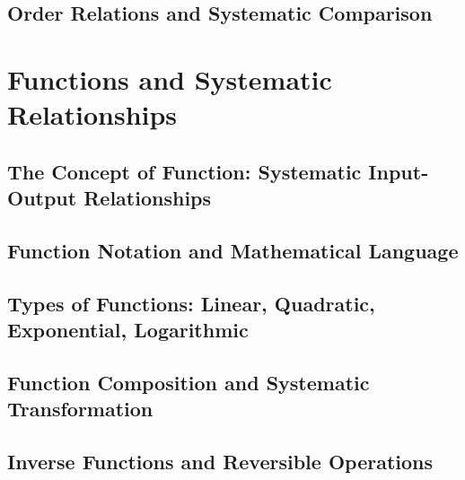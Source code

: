 \documentclass[12pt, oneside, openany]{book}
\begin{document}
\section{Order Relations and Systematic Comparison}


\chapter{Functions and Systematic Relationships}

\section{The Concept of Function: Systematic Input-Output Relationships}

\section{Function Notation and Mathematical Language}

\section{Types of Functions: Linear, Quadratic, Exponential, Logarithmic}

\section{Function Composition and Systematic Transformation}

\section{Inverse Functions and Reversible Operations}
\end{document}
